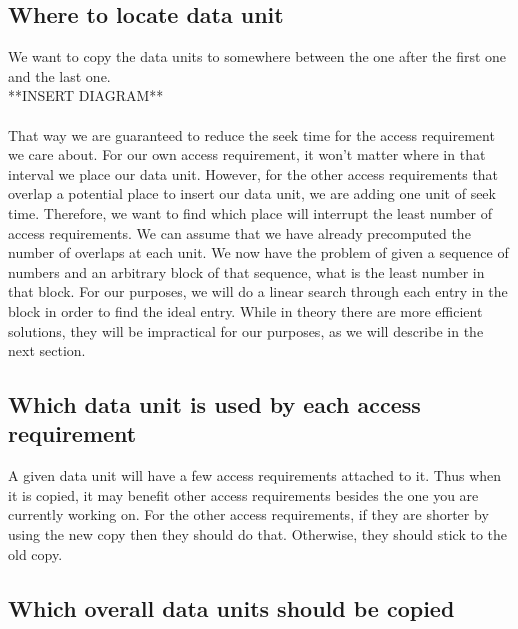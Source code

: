 \documentclass[conference]{acmsiggraph}
\begin{document}
\subsection{Where to locate data unit}

We want to copy the data units to somewhere between the one after the first one and the last one. \\
**INSERT DIAGRAM**\\
\\
That way we are guaranteed to reduce the seek time for the access requirement we care about. For our own access requirement, it won't matter where in that interval we place our data unit. However, for the other access requirements that overlap a potential place to insert our data unit, we are adding one unit of seek time. Therefore, we want to find which place will interrupt the least number of access requirements. We can assume that we have already precomputed the number of overlaps at each unit. We now have the problem of given a sequence of numbers and an arbitrary block of that sequence, what is the least number in that block. For our purposes, we will do a linear search through each entry in the block in order to find the ideal entry. While in theory there are more efficient solutions, they will be impractical for our purposes, as we will describe in the next section.

\subsection{Which data unit is used by each access requirement}

A given data unit will have a few access requirements attached to it. Thus when it is copied, it may benefit other access requirements besides the one you are currently working on. For the other access requirements, if they are shorter by using the new copy then they should do that. Otherwise, they should stick to the old copy.

\subsection{Which overall data units should be copied}
\end{document}
